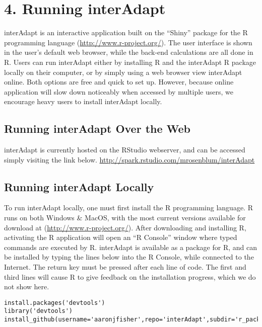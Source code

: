 \documentclass{article}
\newcommand{\interAdapt}{\textsf{interAdapt }}
\begin{document}
\section*{4. Running \interAdapt}

\interAdapt is an interactive application built on the ``Shiny'' package for the R programming language (\url{http://www.r-project.org/}). The user interface is shown in the user’s default web browser, while the back-end calculations are all done in R. Users can run \interAdapt either by installing R and the \interAdapt R package locally on their computer, or by simply using a web browser view \interAdapt online. Both options are free and quick to set up. However, because online application will slow down noticeably when accessed by multiple users, we encourage heavy users to install \interAdapt locally.


\subsection*{Running \interAdapt  Over the Web}

\interAdapt is currently hosted on the RStudio webserver, and can be accessed simply visiting the link below.
\url{http://spark.rstudio.com/mrosenblum/interAdapt}

\subsection*{Running \interAdapt Locally}



To run \interAdapt locally, one must first install the R programming language. R runs on both Windows \& MacOS, with the most current versions available for download at (\url{http://www.r-project.org/}). After downloading and installing R, activating the R application will open an ``R Console'' window where typed commands are executed by R. interAdapt is available as a package for R, and can be installed by typing the lines below into the R Console, while connected to the Internet. The return key must be pressed after each line of code. The first and third lines will cause R to give feedback on the installation progress, which we do not show here.

\vspace{5 mm}
\begin{verbatim}
install.packages('devtools')
library('devtools')
install_github(username='aaronjfisher',repo='interAdapt',subdir='r_package')
\end{verbatim}
\vspace{5 mm}
\end{document}
